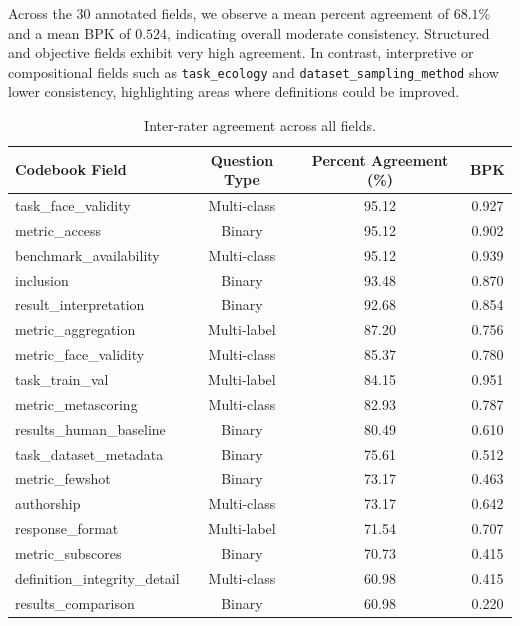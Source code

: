 Across the 30 annotated fields, we observe a mean percent agreement of $68.1\%$ and a mean BPK of $0.524$, indicating overall moderate consistency. Structured and objective fields  exhibit very high agreement. In contrast, interpretive or compositional fields such as \texttt{task\_ecology} and \texttt{dataset\_sampling\_method} show lower consistency, highlighting areas where definitions could be improved.

\begin{table}[h!]
\centering
\caption{Inter-rater agreement across all fields.}
\label{tab:irr-results}
\begin{tabular}{lccc}
\toprule
\textbf{Codebook Field} & \textbf{Question Type} & \textbf{Percent Agreement (\%)} & \textbf{BPK} \\
\midrule
task\_face\_validity          & Multi-class     & 95.12 & 0.927 \\
metric\_access                & Binary          & 95.12 & 0.902 \\
benchmark\_availability       & Multi-class     & 95.12 & 0.939 \\
inclusion                     & Binary          & 93.48 & 0.870 \\
result\_interpretation        & Binary          & 92.68 & 0.854 \\
metric\_aggregation           & Multi-label     & 87.20 & 0.756 \\
metric\_face\_validity        & Multi-class     & 85.37 & 0.780 \\
task\_train\_val              & Multi-label     & 84.15 & 0.951 \\
metric\_metascoring           & Multi-class     & 82.93 & 0.787 \\
results\_human\_baseline      & Binary          & 80.49 & 0.610 \\
task\_dataset\_metadata       & Binary          & 75.61 & 0.512 \\
metric\_fewshot               & Binary          & 73.17 & 0.463 \\
authorship                    & Multi-class     & 73.17 & 0.642 \\
response\_format              & Multi-label     & 71.54 & 0.707 \\
metric\_subscores             & Binary          & 70.73 & 0.415 \\
definition\_integrity\_detail & Multi-class     & 60.98 & 0.415 \\
results\_comparison           & Binary          & 60.98 & 0.220 \\

\end{tabular}
\end{table}
